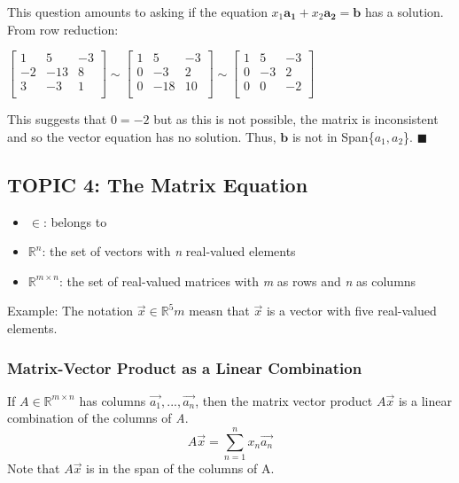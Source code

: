 \documentclass[12pt]{article} %
\newcommand{\R}{\mathbb{R}}
\begin{document}
This question amounts to asking if the equation $x_1\mathbf{a_1} + x_2\mathbf{a_2} = \mathbf{b}$ has a solution. From row reduction:
\begin{center}
	$\begin{bmatrix}
		1 & 5 & -3\\
		-2 & -13 & 8\\
		3 & -3 & 1\\
	\end{bmatrix}
	\sim
	\begin{bmatrix}
		1 & 5 & -3\\
		0 & -3 & 2\\
		0 & -18 & 10\\
	\end{bmatrix}
	\sim
	\begin{bmatrix}
		1 & 5 & -3\\
		0 & -3 & 2\\
		0 & 0 & -2\\
	\end{bmatrix}$
\end{center}
This suggests that $0 = -2$ but as this is not possible, the matrix is inconsistent and so the vector equation has no solution. Thus, $\mathbf{b}$ is not in Span\{\textbf{$a_1, a_2$}\}. $\blacksquare$



\subsection{TOPIC 4: The Matrix Equation}
\begin{itemize}
\item $\in$: \indent belongs to \\
\item $\R^n$: \indent the set of vectors with \emph{n} real-valued elements\\
\item $\R^{m\times n}$: \indent the set of real-valued matrices with \emph{m} as rows and \emph{n} as columns\\
\end{itemize}
Example:
The notation $\vec{x} \in \R^5 m$ measn that $\vec{x}$ is a vector with five real-valued elements.\\

\subsubsection{Matrix-Vector Product as a Linear Combination}
If $A \in \R^{m\times n}$ has columns $\vec{a_1}, ..., \vec{a_n}$, then the matrix vector product $A\vec{x}$ is a linear combination of the columns of \emph{A}. 
$$A\vec{x} = \sum_{n=1}^n x_n \vec{a_n}$$
Note that $A\vec{x}$ is in the span of the columns of A.\\
\end{document}
